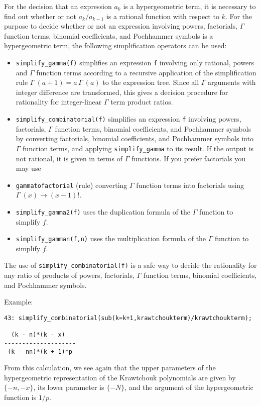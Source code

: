 For the decision that an expression $a_k$ is a hypergeometric term, it is 
necessary to find out whether or not $a_{k}/a_{k-1}$ is a rational
function with respect to $k$. For the purpose to decide
whether or not an expression involving powers, factorials,
$\Gamma$ function terms, 
binomial coefficients, and Pochhammer symbols is a hypergeometric term,
the following simplification operators can be used:
\begin{itemize}
\item
{\tt simplify\_gamma(f)} simplifies an expression {\tt f} involving 
only rational, powers and $\Gamma$ function terms according to a recursive 
application of the simplification rule $\Gamma\:(a+1)=a\,\Gamma\:(a)$ 
to the expression tree. Since all $\Gamma$ arguments with integer difference
are transformed, this gives a decision procedure for rationality
for integer-linear $\Gamma$ term product ratios.
\item
{\tt simplify\_combinatorial(f)} simplifies an expression {\tt f} 
involving powers, factorials, $\Gamma$ function terms,
binomial coefficients, and Pochhammer symbols by converting
factorials, binomial coefficients, and Poch\-hammer symbols into 
$\Gamma$ function terms, and applying {\tt simplify\_gamma} to its
result. If the output is not rational,
it is given in terms of $\Gamma$ functions. If you prefer factorials
you may use
\item
{\tt gammatofactorial} (rule) converting $\Gamma$ function terms into
factorials using $\Gamma\:(x)\rightarrow (x-1)!$.
\item
{\tt simplify\_gamma2(f)}
uses the duplication formula of the $\Gamma$ function to simplify $f$.
\item
{\tt simplify\_gamman(f,n)}
uses the multiplication formula of the $\Gamma$ function to simplify $f$.
\end{itemize}
The use of {\tt simplify\_combinatorial(f)} is a safe way to
decide the rationality for any ratio of products of powers, factorials,
$\Gamma$ function terms, binomial coefficients, and Pochhammer symbols.

Example:

{\small
\begin{verbatim}
43: simplify_combinatorial(sub(k=k+1,krawtchoukterm)/krawtchoukterm);

  (k - n)*(k - x)
--------------------
 (k - nn)*(k + 1)*p
\end{verbatim}
}\noindent
From this calculation, we see again that the upper parameters of
the hypergeometric representation of the Krawtchouk polynomials are given by
$\{-n,-x\}$, its lower parameter is $\{-N\}$, and the argument of the
hypergeometric function is $1/p$.

